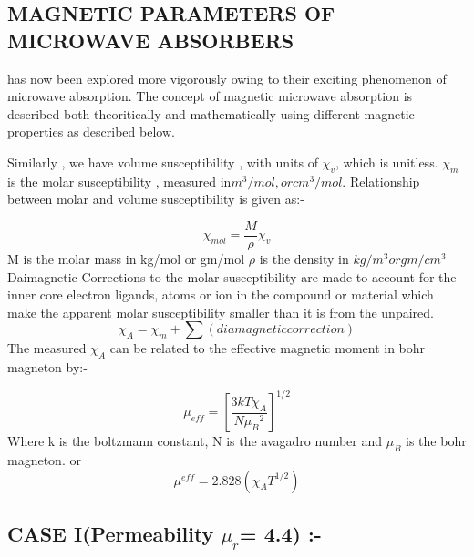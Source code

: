 \documentclass[journal]{IEEEtran}
\begin{document}
\begin{longtable}{|c|c|c|c|c|c|c|c|}
\end{longtable}

\begin{multicols}{2}


\section{MAGNETIC PARAMETERS OF MICROWAVE ABSORBERS}
 has now been explored more vigorously owing to their exciting phenomenon of microwave absorption. The concept of magnetic microwave absorption is described both theoritically and mathematically using different magnetic properties as described below.


Similarly , we have volume susceptibility , with units of $\chi_v$, which is unitless.
$\chi_m$ is the molar susceptibility , measured in$ m^3/mol , or cm^3/mol$. Relationship between molar and volume susceptibility is given as:-

\begin{equation}
{\chi}_{mol} = \dfrac{M}{\rho} \chi_v
\end{equation}
M is the molar mass in kg/mol or gm/mol
$\rho$ is the density in $ kg/m^3 or gm/cm^3$
Daimagnetic Corrections to the molar susceptibility are made to account for the inner core electron ligands, atoms or ion in the compound or material which make the apparent molar susceptibility smaller than it is from the unpaired.
\begin{equation}
\chi_A = \chi_m + \sum(diamagnetic correction)
\end{equation}
The measured $ \chi_A $ can be related to the effective magnetic moment in bohr magneton by:-

\begin{equation}
\mu_{eff} = {[\dfrac{3kT\chi_A}{N {\mu_B}^2}]}^{1/2}
\end{equation}
Where k is the boltzmann constant, N is the avagadro number and $ \mu_B $ is the bohr magneton.
or 
$$\mu^{eff} = 2.828 ({\chi_A T}^{1/2})$$


\subsection{CASE I(Permeability $\mu_r$= 4.4) :-}




\end{multicols}
\end{document}
